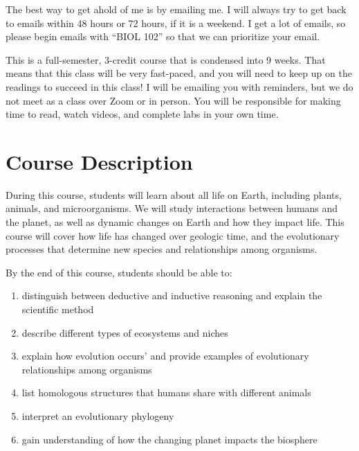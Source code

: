 \documentclass{tufte-handout}
\begin{document}
\begin{fullwidth}

 The best way to get ahold of me is by emailing me. I will always try to get back to emails within 48 hours or 72 hours, if it is a weekend. I get a lot of emails, so please begin emails with ``BIOL 102'' so that we can prioritize your email. 



\color{blue}  This is a full-semester, 3-credit course that is condensed into 9 weeks. That means that this class will be very fast-paced, and you will need to keep up on the readings to succeed in this class!  I will be emailing you with reminders, but we do not meet as a class over Zoom or in person. You will be responsible for making time to read, watch videos, and complete labs in your own time.

\color{black}


\section{Course Description}

During this course, students will learn about all life on Earth, including plants, animals, and microorganisms. We will study interactions between humans and the planet, as well as dynamic changes on Earth and how they impact life. This course will cover how life has changed over geologic time, and the evolutionary processes that determine new species and relationships among organisms.


By the end of this course, students should be able to:  

\begin{enumerate}
	\item distinguish between deductive and inductive reasoning and explain the scientific method
	\item describe different types of ecosystems and niches
	\item explain how evolution occurs’ and provide examples of evolutionary relationships among organisms
	\item list homologous structures that humans share with different animals
	\item interpret an evolutionary phylogeny
	\item gain understanding of how the changing planet impacts the biosphere
\end{enumerate}


\end{fullwidth}
\end{document}
